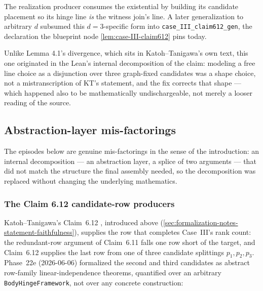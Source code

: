 The realization producer consumes the existential by building its candidate
placement so its hinge line \emph{is} the witness join's line. A later
generalization to arbitrary $d$ subsumed this $d = 3$-specific form into
\texttt{case\_III\_claim612\_gen}, the declaration the blueprint node
\cref{lem:case-III-claim612} pins today.

Unlike Lemma 4.1's divergence, which sits in Katoh--Tanigawa's own text, this
one originated in the Lean's internal decomposition of the claim: modeling a
free line choice as a disjunction over three graph-fixed candidates was a
shape choice, not a mistranscription of KT's statement, and the fix
corrects that shape --- which happened also to be mathematically
undischargeable, not merely a looser reading of the source.

\subsection{Abstraction-layer mis-factorings}
\label{sec:formalization-notes-abstraction-layer}

The episodes below are genuine mis-factorings in the sense of the
introduction: an internal decomposition --- an abstraction layer, a splice of
two arguments --- that did not match the structure the final assembly
needed, so the decomposition was replaced without changing the underlying
mathematics.

\subsubsection{The Claim 6.12 candidate-row producers}

Katoh--Tanigawa's Claim~6.12 \cite[\S6.4.1]{katohTanigawa2011}, introduced above
(\cref{sec:formalization-notes-statement-faithfulness}), supplies the row that completes
Case~III's rank count: the redundant-row argument of Claim~6.11 falls one
row short of the target, and Claim~6.12 supplies the last row from one of
three candidate splittings $p_1, p_2, p_3$. Phase~22e (2026-06-06)
formalized the second and third candidates as abstract row-family
linear-independence theorems, quantified over an arbitrary
\texttt{BodyHingeFramework}, not over any concrete construction:

